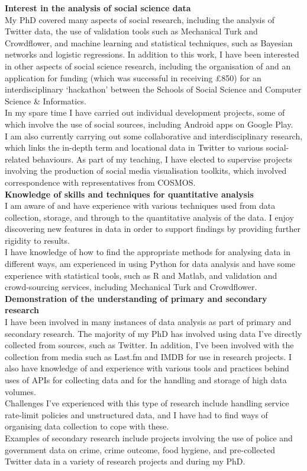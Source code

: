 \documentclass[11pt,a4paper]{article}
\begin{document}
\textbf{Interest in the analysis of social science data}\\
My PhD covered many aspects of social research, including the analysis of Twitter data, the use of validation tools such as Mechanical Turk and Crowdflower, and machine learning and statistical techniques, such as Bayesian networks and logistic regressions. In addition to this work, I have been interested in other aspects of social science research, including the organisation of and an application for funding (which was successful in receiving £850) for an interdisciplinary `hackathon' between the Schools of Social Science and Computer Science \& Informatics.\\
In my spare time I have carried out individual development projects, some of which involve the use of social sources, including Android apps on Google Play.\\
I am also currently carrying out some collaborative and interdisciplinary research, which links the in-depth term and locational data in Twitter to various social-related behaviours. As part of my teaching, I have elected to supervise projects involving the production of social media visualisation toolkits, which involved correspondence with representatives from COSMOS.\\

\textbf{Knowledge of skills and techniques for quantitative analysis}\\
I am aware of and have experience with various techniques used from data collection, storage, and through to the quantitative analysis of the data. I enjoy discovering new features in data in order to support findings by providing further rigidity to results.\\
I have knowledge of how to find the appropriate methods for analysing data in different ways, am experienced in using Python for data analysis and have some experience with statistical tools, such as R and Matlab, and validation and crowd-sourcing services, including Mechanical Turk and Crowdflower.\\

\textbf{Demonstration of the understanding of primary and secondary research}\\
I have been involved in many instances of data analysis as part of primary and secondary research. The majority of my PhD has involved using data I've directly collected from sources, such as Twitter. In addition, I've been involved with the collection from media such as Last.fm and IMDB for use in research projects. I also have knowledge of and experience with various tools and practices behind uses of APIs for collecting data and for the handling and storage of high data volumes.\\
Challenges I've experienced with this type of research include handling service rate-limit policies and unstructured data, and I have had to find ways of organising data collection to cope with these.\\
Examples of secondary research include projects involving the use of police and government data on crime, crime outcome, food hygiene, and pre-collected Twitter data in a variety of research projects and during my PhD.\\
\end{document}
